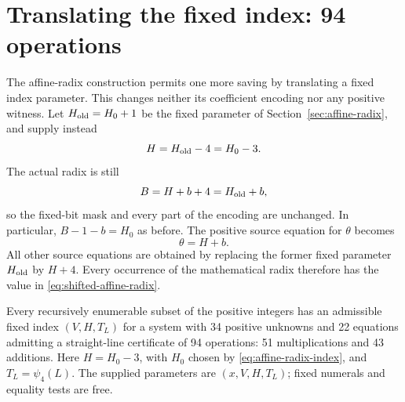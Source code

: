 \section{Translating the fixed index: 94 operations}
\label{sec:shifted-affine}

The affine-radix construction permits one more saving by translating
a fixed index parameter. This changes neither its coefficient
encoding nor any positive witness. Let $H_{\rm old}=H_0+1$ be
the fixed parameter of Section~\ref{sec:affine-radix}, and supply
instead
\begin{equation}\label{eq:shifted-affine-index}
 H=H_{\rm old}-4=H_0-3.
\end{equation}
The actual radix is still
\begin{equation}\label{eq:shifted-affine-radix}
 B=H+b+4=H_{\rm old}+b,
\end{equation}
so the fixed-bit mask and every part of the encoding are unchanged.
In particular, $B-1-b=H_0$ as before. The positive source equation
for $\theta$ becomes
\begin{equation}\label{eq:shifted-affine-theta}
 \theta=H+b.
\end{equation}
All other source equations are obtained by replacing the former
fixed parameter $H_{\rm old}$ by $H+4$. Every occurrence of the
mathematical radix therefore has the value in
\eqref{eq:shifted-affine-radix}.

\begin{theorem}\label{thm:best94}
Every recursively enumerable subset of the positive integers has
an admissible fixed index $(V,H,T_L)$ for a system with 34 positive
unknowns and 22 equations admitting a straight-line certificate of
94 operations: 51 multiplications and 43 additions. Here
$H=H_0-3$, with $H_0$ chosen by
\eqref{eq:affine-radix-index}, and $T_L=\psi_4(L)$.
The supplied parameters are $(x,V,H,T_L)$; fixed numerals and
equality tests are free.
\end{theorem}

